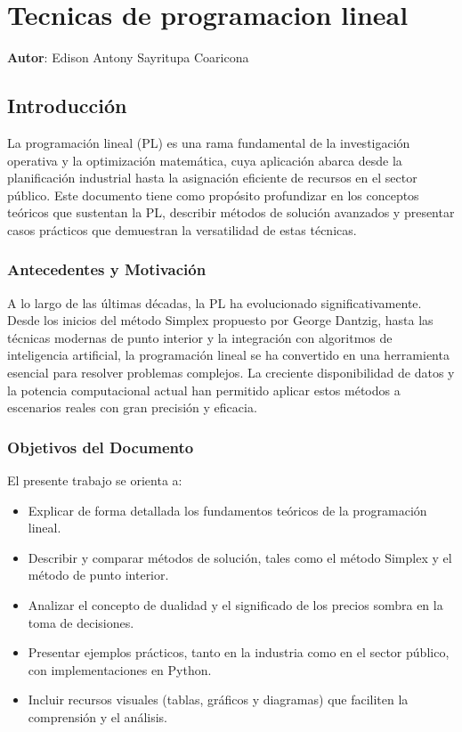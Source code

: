 
	\chapter{Tecnicas de programacion lineal}
	\textbf{Autor}: \large{Edison Antony Sayritupa Coaricona}
	\label{chap:5}
	
	\section{Introducción}
	
	La programación lineal (PL) es una rama fundamental de la investigación operativa y la optimización matemática, cuya aplicación abarca desde la planificación industrial hasta la asignación eficiente de recursos en el sector público. Este documento tiene como propósito profundizar en los conceptos teóricos que sustentan la PL, describir métodos de solución avanzados y presentar casos prácticos que demuestran la versatilidad de estas técnicas.
	
	\subsection{Antecedentes y Motivación}
	A lo largo de las últimas décadas, la PL ha evolucionado significativamente. Desde los inicios del método Simplex propuesto por George Dantzig, hasta las técnicas modernas de punto interior y la integración con algoritmos de inteligencia artificial, la programación lineal se ha convertido en una herramienta esencial para resolver problemas complejos. La creciente disponibilidad de datos y la potencia computacional actual han permitido aplicar estos métodos a escenarios reales con gran precisión y eficacia.
	
	\subsection{Objetivos del Documento}
	El presente trabajo se orienta a:
	\begin{itemize}
		\item Explicar de forma detallada los fundamentos teóricos de la programación lineal.
		\item Describir y comparar métodos de solución, tales como el método Simplex y el método de punto interior.
		\item Analizar el concepto de dualidad y el significado de los precios sombra en la toma de decisiones.
		\item Presentar ejemplos prácticos, tanto en la industria como en el sector público, con implementaciones en Python.
		\item Incluir recursos visuales (tablas, gráficos y diagramas) que faciliten la comprensión y el análisis.
	\end{itemize}
	
